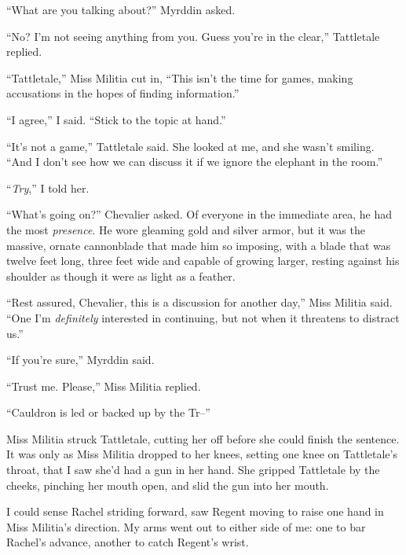 ``What are you talking about?''  Myrddin asked.



``No?  I'm not seeing anything from you.  Guess you're in the clear,'' Tattletale replied.



``Tattletale,'' Miss Militia cut in, ``This isn't the time for games, making accusations in the hopes of finding information.''



``I agree,'' I said.  ``Stick to the topic at hand.''



``It's not a game,'' Tattletale said.  She looked at me, and she wasn't smiling.  ``And I don't see how we can discuss it if we ignore the elephant in the room.''



``\emph{Try},'' I told her.



``What's going on?'' Chevalier asked.  Of everyone in the immediate area, he had the most \emph{presence}.  He wore gleaming gold and silver armor, but it was the massive, ornate cannonblade that made him so imposing, with a blade that was twelve feet long, three feet wide and capable of growing larger, resting against his shoulder as though it were as light as a feather.



``Rest assured, Chevalier, this is a discussion for another day,'' Miss Militia said.  ``One I'm \emph{definitely} interested in continuing, but not when it threatens to distract us.''



``If you're sure,'' Myrddin said.



``Trust me.  Please,'' Miss Militia replied.



``Cauldron is led or backed up by the Tr--''



Miss Militia struck Tattletale, cutting her off before she could finish the sentence.  It was only as Miss Militia dropped to her knees, setting one knee on Tattletale's throat, that I saw she'd had a gun in her hand.  She gripped Tattletale by the cheeks, pinching her mouth open, and slid the gun into her mouth.



I could sense Rachel striding forward, saw Regent moving to raise one hand in Miss Militia's direction.  My arms went out to either side of me: one to bar Rachel's advance, another to catch Regent's wrist.



